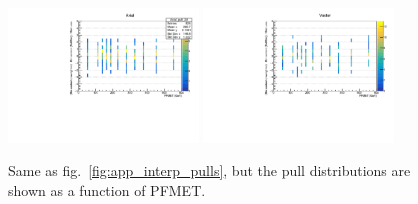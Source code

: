  \begin{figure}[htbp]
   \begin{center}
	\includegraphics[width=0.45\textwidth]{figures/interpolation_appendix/Axial_pulls_2d.pdf}
	\includegraphics[width=0.45\textwidth]{figures/interpolation_appendix/Vector_pulls_2d.pdf}
     \caption{Same as fig.~\ref{fig:app_interp_pulls}, but the pull distributions are shown as a function of PFMET.}
     \label{fig:app_interp_pulls_2d}
   \end{center}
 \end{figure}

